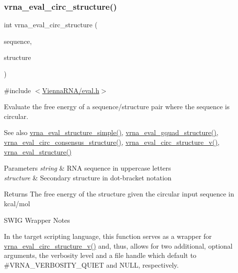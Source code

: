 \subsubsection{\texorpdfstring{vrna\+\_\+eval\+\_\+circ\+\_\+structure()}{vrna\_eval\_circ\_structure()}}
{\footnotesize\ttfamily int vrna\+\_\+eval\+\_\+circ\+\_\+structure (\begin{DoxyParamCaption}\item[{const char $\ast$}]{sequence,  }\item[{const char $\ast$}]{structure }\end{DoxyParamCaption})}



{\ttfamily \#include $<$\hyperlink{eval_8h}{Vienna\+R\+N\+A/eval.\+h}$>$}



Evaluate the free energy of a sequence/structure pair where the sequence is circular. 

\begin{DoxySeeAlso}{See also}
\hyperlink{group__eval_ga7e5273464b775d4130245681312c1369}{vrna\+\_\+eval\+\_\+structure\+\_\+simple()}, \hyperlink{group__eval_ga3263504825ef4b523eba797c99921df4}{vrna\+\_\+eval\+\_\+gquad\+\_\+structure()}, \hyperlink{group__eval_gac96577cf232c71160f762737a994b7c6}{vrna\+\_\+eval\+\_\+circ\+\_\+consensus\+\_\+structure()}, \hyperlink{group__eval_gac3fb44e0773a51be8efc5f4f595a94a7}{vrna\+\_\+eval\+\_\+circ\+\_\+structure\+\_\+v()}, \hyperlink{group__eval_ga58f199f1438d794a265f3b27fc8ea631}{vrna\+\_\+eval\+\_\+structure()}
\end{DoxySeeAlso}

\begin{DoxyParams}{Parameters}
{\em string} & R\+NA sequence in uppercase letters \\
\hline
{\em structure} & Secondary structure in dot-\/bracket notation \\
\hline
\end{DoxyParams}
\begin{DoxyReturn}{Returns}
The free energy of the structure given the circular input sequence in kcal/mol
\end{DoxyReturn}
\begin{DoxyRefDesc}{S\+W\+I\+G Wrapper Notes}
\item[\hyperlink{wrappers__wrappers000036}{S\+W\+I\+G Wrapper Notes}]In the target scripting language, this function serves as a wrapper for \hyperlink{group__eval_gac3fb44e0773a51be8efc5f4f595a94a7}{vrna\+\_\+eval\+\_\+circ\+\_\+structure\+\_\+v()} and, thus, allows for two additional, optional arguments, the verbosity level and a file handle which default to \#\+V\+R\+N\+A\+\_\+\+V\+E\+R\+B\+O\+S\+I\+T\+Y\+\_\+\+Q\+U\+I\+ET and N\+U\+LL, respectively. \end{DoxyRefDesc}
\mbox{\label{group__eval_ga3263504825ef4b523eba797c99921df4}} 
